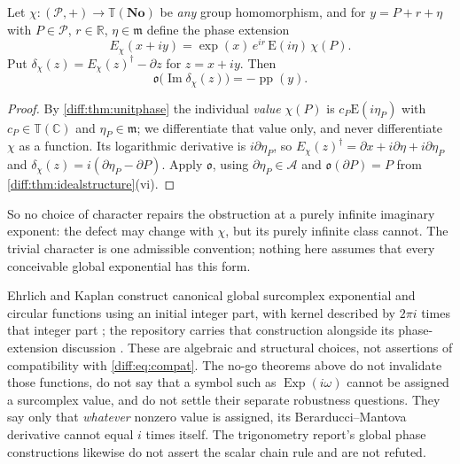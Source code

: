 \documentclass[11pt,letterpaper]{article}
\numberwithin{equation}{section}
\theoremstyle{definition}
\theoremstyle{remark}
\newcommand{\No}{\mathbf{No}}
\newcommand{\R}{\mathbb R}
\newcommand{\C}{\mathbb C}
\newcommand{\der}{\partial}
\newcommand{\mm}{\mathfrak m}
\newcommand{\Pcl}{\mathcal P}
\newcommand{\Acl}{\mathcal A}
\newcommand{\Obs}{\mathfrak o}
\newcommand{\pp}{\operatorname{pp}}
\newcommand{\Imm}{\operatorname{Im}}
\newcommand{\Emm}{\mathrm{E}}
\newcommand{\Tor}{\mathbb T}
\begin{document}
\begin{proposition}
\label{diff:prop:defect}
Let $\chi:(\Pcl,+)\to\Tor(\No)$ be \emph{any} group homomorphism, and for
$y=P+r+\eta$ with $P\in\Pcl$, $r\in\R$, $\eta\in\mm$ define the phase
extension
\[
 E_{\chi}(x+iy)=\exp(x)\,e^{ir}\,\Emm(i\eta)\,\chi(P).
\]
Put $\delta_{\chi}(z)=E_{\chi}(z)^{\dagger}-\der z$ for $z=x+iy$. Then
\begin{equation}\label{diff:eq:defect}
 \Obs\bigl(\Imm\delta_{\chi}(z)\bigr)=-\pp(y).
\end{equation}
\end{proposition}
\begin{proof}
By \cref{diff:thm:unitphase} the individual \emph{value} $\chi(P)$ is
$c_{P}\Emm(i\eta_{P})$ with $c_{P}\in\Tor(\C)$ and $\eta_{P}\in\mm$; we
differentiate that value only, and never differentiate $\chi$ as a function.
Its logarithmic derivative is $i\der\eta_{P}$, so
$E_{\chi}(z)^{\dagger}=\der x+i\der\eta+i\der\eta_{P}$ and
$\delta_{\chi}(z)=i(\der\eta_{P}-\der P)$. Apply $\Obs$, using
$\der\eta_{P}\in\Acl$ and $\Obs(\der P)=P$ from
\cref{diff:thm:idealstructure}(vi).
\end{proof}

So no choice of character repairs the obstruction at a purely infinite
imaginary exponent: the defect may change with $\chi$, but its purely infinite
class cannot. The trivial character is one admissible convention; nothing here
assumes that every conceivable global exponential has this form.

\begin{warning}
\label{diff:warn:notdenied}
Ehrlich and Kaplan construct canonical global surcomplex exponential and
circular functions using an initial integer part, with kernel described by
$2\pi i$ times that integer part \cite[\S11]{EK}; the repository carries that
construction alongside its phase-extension discussion \cite{RepoTrig}. These
are algebraic and structural choices, not assertions of compatibility with
\cref{diff:eq:compat}. The no-go theorems above do not invalidate those
functions, do not say that a symbol such as $\operatorname{Exp}(i\omega)$
cannot be assigned a surcomplex value, and do not settle their separate
robustness questions. They say only that \emph{whatever} nonzero value is
assigned, its Berarducci--Mantova derivative cannot equal $i$ times itself.
The trigonometry report's global phase constructions likewise do not assert
the scalar chain rule and are not refuted.
\end{warning}
\end{document}
